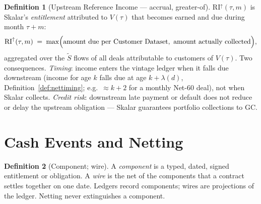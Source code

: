 \documentclass[11pt, a4paper]{article}
\theoremstyle{definition}
\newtheorem{definition}{Definition}[section]
\newcommand{\src}[1]{}
\newcommand{\GCCIA}{upstream facility}
\newcommand{\RIup}{\mathrm{RI}^{\uparrow}}        %
\newcommand{\Stil}{\tilde{S}}                     %
\begin{document}
\begin{definition}[Upstream Reference Income --- accrual, greater-of]\label{def:riup}
$\RIup(\tau, m)$ is Skalar's \emph{entitlement} attributed to $V(\tau)$ that becomes earned and due during month $\tau + m$:
\begin{equation}
\RIup(\tau, m) \;=\; \max\Bigl( \text{amount due per Customer Dataset},\ \text{amount actually collected} \Bigr),
\end{equation}
aggregated over the $\Stil$ flows of all deals attributable to customers of $V(\tau)$. Two consequences. \emph{Timing}: income enters the vintage ledger when it falls due downstream (income for age $k$ falls due at age $k + \lambda(d)$, Definition~\ref{def:nettiming}; e.g.\ $\approx k+2$ for a monthly Net-60 deal), not when Skalar collects. \emph{Credit risk}: downstream late payment or default does not reduce or delay the upstream obligation --- Skalar guarantees portfolio collections to GC.
\src{\GCCIA{} Sch.~A (``Reference Income'': ``occurs as of the date on which it becomes earned and due'' and ``the greater of (x) \dots and (y) \dots'').}
\end{definition}

\section{Cash Events and Netting}\label{sec:events}

\begin{definition}[Component; wire]\label{def:component}
A \emph{component} is a typed, dated, signed entitlement or obligation. A \emph{wire} is the net of the components that a contract settles together on one date. Ledgers record components; wires are projections of the ledger. Netting never extinguishes a component.
\end{definition}
\end{document}
